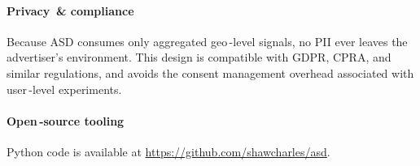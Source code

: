 \documentclass[final,3p,fleqn, 10pt]{elsarticle}
\begin{document}
\paragraph{Privacy \,\& compliance} Because ASD consumes only aggregated geo\,-level signals, no PII ever leaves the advertiser's environment. This design is compatible with GDPR, CPRA, and similar regulations, and avoids the consent management overhead associated with user\,-level experiments.

\paragraph{Open\,-source tooling} Python code is available at \url{https://github.com/shawcharles/asd}. %
\end{document}
